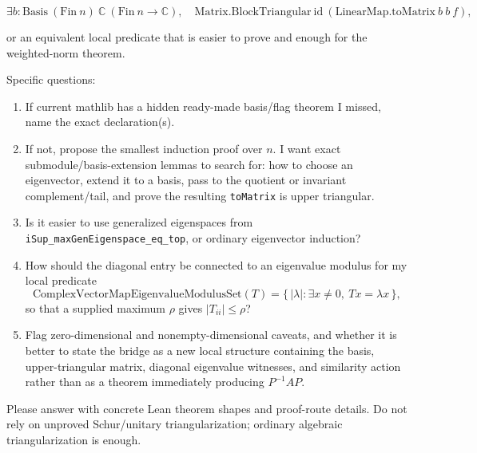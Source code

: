 \[
\exists b : \mathrm{Basis}\ (\mathrm{Fin}\ n)\ \mathbb C\ (\mathrm{Fin}\ n\to\mathbb C),
\quad \mathrm{Matrix.BlockTriangular}\ \mathrm{id}\
  (\mathrm{LinearMap.toMatrix}\ b\ b\ f),
\]

or an equivalent local predicate that is easier to prove and enough for the
weighted-norm theorem.

Specific questions:

\begin{enumerate}
\item If current mathlib has a hidden ready-made basis/flag theorem I missed,
name the exact declaration(s).
\item If not, propose the smallest induction proof over \(n\).  I want exact
submodule/basis-extension lemmas to search for: how to choose an eigenvector,
extend it to a basis, pass to the quotient or invariant complement/tail, and
prove the resulting \texttt{toMatrix} is upper triangular.
\item Is it easier to use generalized eigenspaces from
\texttt{iSup\_maxGenEigenspace\_eq\_top}, or ordinary eigenvector induction?
\item How should the diagonal entry be connected to an eigenvalue modulus for
my local predicate
\[
\mathrm{ComplexVectorMapEigenvalueModulusSet}(T)
 = \{\,|\lambda| : \exists x\ne0,\ T x=\lambda x\,\},
\]
so that a supplied maximum \(\rho\) gives \(|T_{ii}|\le\rho\)?
\item Flag zero-dimensional and nonempty-dimensional caveats, and whether it is
better to state the bridge as a new local structure containing the basis,
upper-triangular matrix, diagonal eigenvalue witnesses, and similarity action
rather than as a theorem immediately producing \(P^{-1}AP\).
\end{enumerate}

Please answer with concrete Lean theorem shapes and proof-route details.  Do
not rely on unproved Schur/unitary triangularization; ordinary algebraic
triangularization is enough.

